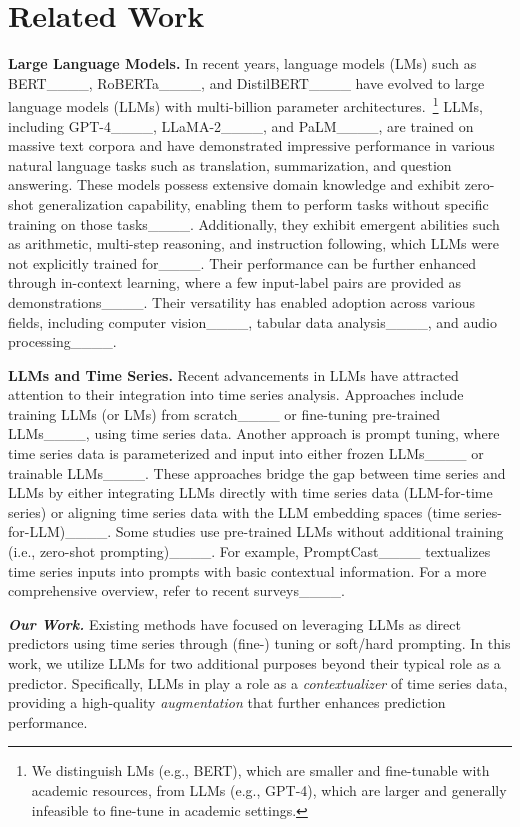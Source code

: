 \section{Related Work}
\label{sec:related}
\noindent\textbf{Large Language Models.}
In recent years, language models (LMs) such as BERT____, RoBERTa____, and DistilBERT____ have evolved to large language models (LLMs) with multi-billion parameter architectures.~\footnote{We distinguish LMs (e.g., BERT), which are smaller and fine-tunable with academic resources, from LLMs (e.g., GPT-4), which are larger and generally infeasible to fine-tune in academic settings.}
LLMs, including GPT-4____, LLaMA-2____, and PaLM____, are trained on massive text corpora and have demonstrated impressive performance in various natural language tasks such as translation, summarization, and question answering.
These models possess extensive domain knowledge and exhibit zero-shot generalization capability, enabling them to perform tasks without specific training on those tasks____. 
Additionally, they exhibit emergent abilities such as arithmetic, multi-step reasoning, and instruction following, which LLMs were not explicitly trained for____. 
Their performance can be further enhanced through in-context learning, where a few input-label pairs are provided as demonstrations____.
Their versatility has enabled adoption across various fields, including computer vision____, tabular data analysis____, and audio processing____.

\noindent\textbf{LLMs and Time Series.}
Recent advancements in LLMs have attracted attention to their integration into time series analysis.
Approaches include training LLMs (or LMs) from scratch____ or fine-tuning pre-trained LLMs____, using time series data.
Another approach is prompt tuning, where time series data is parameterized and input into either frozen LLMs____ or trainable LLMs____.
These approaches bridge the gap between time series and LLMs by either integrating LLMs directly with time series data (LLM-for-time series) or aligning time series data with the LLM embedding spaces (time series-for-LLM)____.
Some studies use pre-trained LLMs without additional training (i.e., zero-shot prompting)____. 
For example, PromptCast____ textualizes time series inputs into prompts with basic contextual information.
For a more comprehensive overview, refer to recent surveys____.

\noindent\textit{\textbf{Our Work.}} Existing methods have focused on leveraging LLMs as direct predictors using time series through (fine-) tuning or soft/hard prompting. 
In this work, we utilize LLMs for two additional purposes beyond their typical role as a predictor.
Specifically, LLMs in \method play a role as a \textit{contextualizer} of time series data, providing a high-quality \textit{augmentation} that further enhances prediction performance.